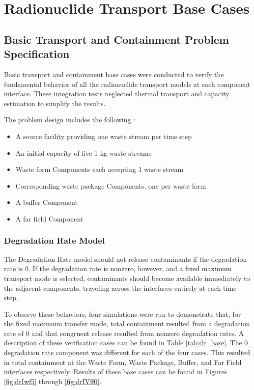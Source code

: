\section{Radionuclide Transport Base Cases}\label{sec:nuclide_base_cases}
\subsection{Basic Transport and Containment Problem Specification}
Basic transport and containment base cases were conducted to verify the 
fundamental behavior of all the radionuclide transport models at each component 
interface. These integration tests neglected thermal transport and capacity 
estimation to simplify the results.  

The problem design includes the following : 
\begin{itemize}
\item{A source facility providing one waste stream per time step}
\item{An initial capacity of five 1 kg waste streams}
\item{Waste form Components each accepting 1 waste stream} 
\item{Corresponding waste package Components, one per waste form}
\item{A buffer Component}
\item{A far field Component}
\end{itemize}

\subsubsection{Degradation Rate Model}
The Degradation Rate model should not release contaminants if the degradation 
rate is 0. If the degradation rate is nonzero, however, and a fixed maximum 
transport mode is selected, contaminants should become available immediately to 
the adjacent components, traveling across the interfaces entirely at each 
time step. 

To observe these behaviors, four simulations were run to demonstrate that, for 
the fixed maximum transfer mode, total 
containment resulted from a degradation rate of 0 and that congruent release 
resulted from nonzero degradation rates. A description of these verification 
cases can be found in Table \ref{tab:dr_base}. The 0 degradation rate component was 
different for each of the four cases. This resulted in total containment at the 
Waste Form, Waste Package, Buffer, and Far Field interfaces respectively. 
Results of these base cases can be found in Figures 
\ref{fig:drIwf5} through \ref{fig:drIVff0}.
\FloatBarrier


\FloatBarrier

